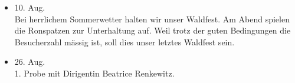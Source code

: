 \begin{history}
\begin{itemize}
        \item[]10. Aug.\\
        Bei herrlichem Sommerwetter halten wir unser Waldfest. Am Abend spielen
        die Ronspatzen zur Unterhaltung auf. Weil trotz der guten Bedingungen
        die Besucherzahl mässig ist, soll dies unser letztes Waldfest sein.

        \item[]26. Aug.\\
        1. Probe mit Dirigentin Beatrice Renkewitz.


    \end{itemize}

\end{history}
